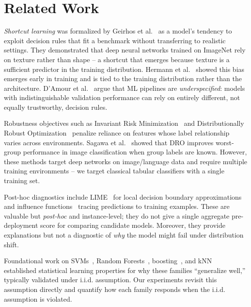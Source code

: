 \documentclass[conference]{IEEEtran}
\begin{document}

\section{Related Work}
\label{sec:related_work}

\textit{Shortcut learning} was formalized by Geirhos et al.~\cite{geirhos2020shortcut} as a model's tendency to exploit decision rules that fit a benchmark without transferring to realistic settings. They demonstrated that deep neural networks trained on ImageNet rely on texture rather than shape -- a shortcut that emerges because texture is a sufficient predictor in the training distribution. Hermann et al.~\cite{hermann2020origins} showed this bias emerges early in training and is tied to the training distribution rather than the architecture. D'Amour et al.~\cite{damour2020underspecification} argue that ML pipelines are \textit{underspecified}: models with indistinguishable validation performance can rely on entirely different, not equally trustworthy, decision rules.

Robustness objectives such as Invariant Risk Minimization~\cite{arjovsky2019irm} and Distributionally Robust Optimization~\cite{sagawa2020dro} penalize reliance on features whose label relationship varies across environments. Sagawa et al.~\cite{sagawa2020dro} showed that DRO improves worst-group performance in image classification when group labels are known. However, these methods target deep networks on image/language data and require multiple training environments -- we target classical tabular classifiers with a single training set.

Post-hoc diagnostics include LIME~\cite{ribeiro2016lime} for local decision boundary approximations and influence functions~\cite{koh2017influence} tracing predictions to training examples. These are valuable but \textit{post-hoc} and instance-level; they do not give a single aggregate pre-deployment score for comparing candidate models. Moreover, they provide explanations but not a diagnostic of \textit{why} the model might fail under distribution shift.

Foundational work on SVMs~\cite{cortes1995svm}, Random Forests~\cite{breiman2001rf}, boosting~\cite{freund1997adaboost}, and kNN~\cite{cover1967knn} established statistical learning properties for why these families ``generalize well,'' typically validated under i.i.d. assumption. Our experiments revisit this assumption directly and quantify how each family responds when the i.i.d. assumption is violated.
\end{document}
